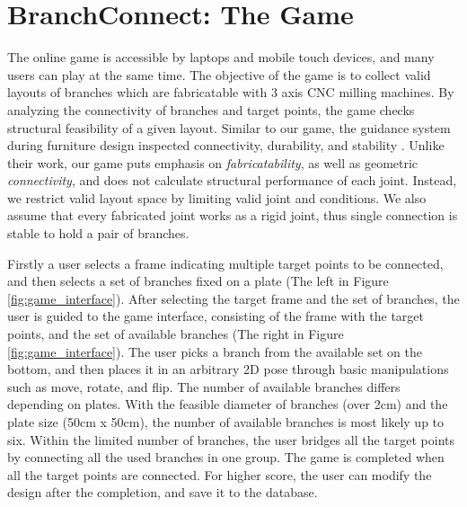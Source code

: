 \section{BranchConnect: The Game}
\label{sec:game}
The online game is accessible by laptops and mobile touch devices, and many users can play at the same time.
The objective of the game is to collect valid layouts of branches which are fabricatable with 3 axis CNC milling machines.
By analyzing the connectivity of branches and target points, the game checks structural feasibility of a given layout.
Similar to our game, the guidance system during furniture design inspected connectivity, durability, and stability \cite{umetani2012guided}.
Unlike their work, our game puts emphasis on \textit{fabricatability}, as well as geometric \textit{connectivity}, and does not calculate structural performance of each joint.
Instead, we restrict valid layout space by limiting valid joint and conditions.
We also assume that every fabricated joint works as a rigid joint, thus single connection is stable to hold a pair of branches.



Firstly a user selects a frame indicating multiple target points to be connected, and then selects a set of branches fixed on a plate (The left in Figure \ref{fig:game_interface}).
After selecting the target frame and the set of branches, the user is guided to the game interface, consisting of the frame with the target points, and the set of available branches (The right in Figure \ref{fig:game_interface}).
The user picks a branch from the available set on the bottom, and then places it in an arbitrary 2D pose through basic manipulations such as move, rotate, and flip.
The number of available branches differs depending on plates.
With the feasible diameter of branches (over 2cm) and the plate size (50cm x 50cm), the number of available branches is most likely up to six.
Within the limited number of branches, the user bridges all the target points by connecting all the used branches in one group.
The game is completed when all the target points are connected.
For higher score, the user can modify the design after the completion, and save it to the database.

